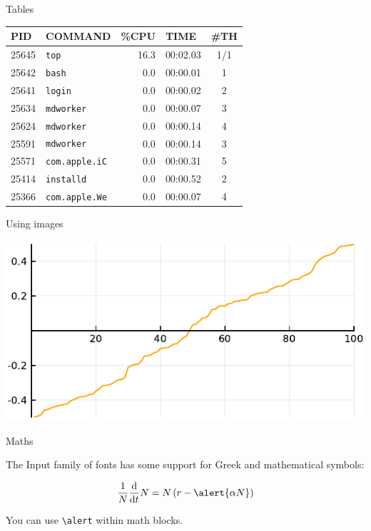 \documentclass[11pt, compress, aspectratio=1610]{beamer}
\let\OldTexttt\texttt
\renewcommand{\texttt}[1]{\OldTexttt{\color{plTT}#1}}
\begin{document}
\begin{frame}[fragile]{%
\protect\hypertarget{tables}{%
Tables}}

\begin{longtable}[]{@{}llrlc@{}}
\toprule
PID & COMMAND & \%CPU & TIME & \#TH\tabularnewline
\midrule
\endhead
25645 & \texttt{top} & 16.3 & 00:02.03 & 1/1\tabularnewline
25642 & \texttt{bash} & 0.0 & 00:00.01 & 1\tabularnewline
25641 & \texttt{login} & 0.0 & 00:00.02 & 2\tabularnewline
25634 & \texttt{mdworker} & 0.0 & 00:00.07 & 3\tabularnewline
25624 & \texttt{mdworker} & 0.0 & 00:00.14 & 4\tabularnewline
25591 & \texttt{mdworker} & 0.0 & 00:00.14 & 3\tabularnewline
25571 & \texttt{com.apple.iC} & 0.0 & 00:00.31 & 5\tabularnewline
25414 & \texttt{installd} & 0.0 & 00:00.52 & 2\tabularnewline
25366 & \texttt{com.apple.We} & 0.0 & 00:00.07 & 4\tabularnewline
\bottomrule
\end{longtable}

\end{frame}

\begin{frame}{%
\protect\hypertarget{using-images}{%
Using images}}

\includegraphics[width=\textwidth]{figures/density.pdf}

\end{frame}

\begin{frame}[fragile]{%
\protect\hypertarget{maths}{%
Maths}}

The Input family of fonts has some support for Greek and mathematical
symbols:

\[
\frac{1}{N}\frac{\text{d}}{\text{d}t}N = N\left(r-\alert{\alpha N}\right)
\]

You can use \texttt{\textbackslash{}alert} within math blocks.

\end{frame}
\end{document}
